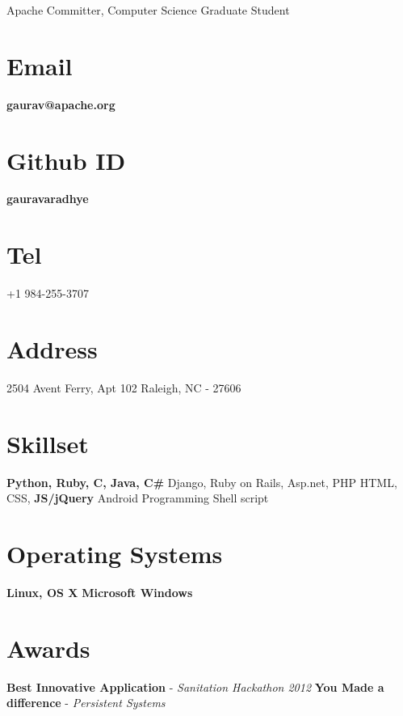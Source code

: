 \documentclass[]{friggeri-cv}
\begin{document}
      {Apache Committer, Computer Science Graduate Student}
      
\noindent\hspace{-0.16\textwidth}\makebox[\linewidth]{\rule{19.5cm}{0.4pt}}

\begin{aside}
\vspace{30 mm} \leavevmode
  \section{Email}
    \textbf{gaurav@apache.org}
    ~
  \section{Github ID}
    \textbf{gauravaradhye}
    ~
  \section{Tel}
    +1 984-255-3707
    ~
  \section{Address}
    2504 Avent Ferry, Apt 102
    Raleigh, NC - 27606
    ~
  \section{Skillset}
        \textbf{Python, Ruby, C, Java, C\#}
        Django, Ruby on Rails, Asp.net, PHP
        HTML, CSS, \textbf{JS/jQuery}
        Android Programming
        Shell script
~
  \section{Operating Systems}
        \textbf{Linux, OS X}\leavevmode
        \textbf{Microsoft Windows}
~
  \section{Awards}
        \textbf{Best Innovative Application} -
        \emph{Sanitation Hackathon 2012}
        \vspace{1mm} \leavevmode
        \textbf{You Made a difference} -
        \emph{Persistent Systems}
~
\end{aside}
\end{document}
